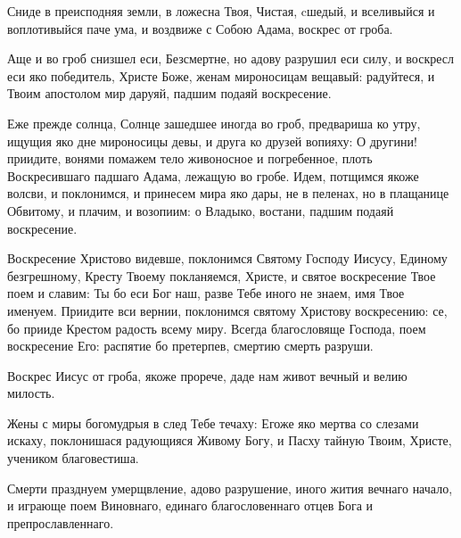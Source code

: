 \begin{mymulticols}

Сниде в преисподняя земли, в ложесна Твоя, Чистая, cшедый, и вселивыйся и воплотивыйся паче ума, и воздвиже с Собою Адама, воскрес от гроба. 


Аще и во гроб снизшел еси, Безсмертне, но адову разрушил еси силу, и воскресл еси яко победитель, Христе Боже, женам мироносицам вещавый: радуйтеся, и Твоим апостолом мир даруяй, падшим подаяй воскресение. 


Еже прежде солнца, Солнце зашедшее иногда во гроб, предвариша ко утру, ищущия яко дне мироносицы девы, и друга ко друзей вопияху: О другини! приидите, вонями помажем тело живоносное и погребенное, плоть Воскресившаго падшаго Адама, лежащую во гробе. Идем, потщимся якоже волсви, и поклонимся, и принесем мира яко дары, не в пеленах, но в плащанице Обвитому, и плачим, и возопиим: о Владыко, востани, падшим подаяй воскресение. 

Воскресение Христово видевше, поклонимся Святому Господу Иисусу, Единому безгрешному, Кресту Твоему покланяемся, Христе, и святое воскресение Твое поем и славим: Ты бо еси Бог наш, разве Тебе иного не знаем, имя Твое именуем. Приидите вси вернии, поклонимся святому Христову воскресению: се, бо прииде Крестом радость всему миру. Всегда благословяще Господа, поем воскресение Его: распятие бо претерпев, смертию смерть разруши.  

Воскрес Иисус от гроба, якоже прорече, даде нам живот вечный и велию милость.  




Жены с миры богомудрыя в след Тебе течаху: Егоже яко мертва со слезами искаху, поклонишася радующияся Живому Богу, и Пасху тайную Твоим, Христе, учеником благовестиша. 


Смерти празднуем умерщвление, адово разрушение, иного жития вечнаго начало, и играюще поем Виновнаго, единаго благословеннаго отцев Бога и препрославленнаго. 



\end{mymulticols}
